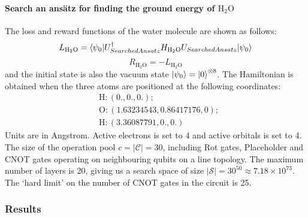 \documentclass{ieeeaccess}
\begin{document}
\paragraph{Search an ans\"atz for finding the ground energy of $\text{H}_2\text{O}$} The loss and reward functions of the water molecule are shown as follows:
\begin{equation}
    L_{\text{H}_2\text{O}} =\langle \psi_0 \vert U_{\rm SearchedAnsatz}^{\dagger} H_{\text{H}_2\text{O}} U_{\rm SearchedAnsatz} \vert \psi_0\rangle
\end{equation}
\begin{equation}
    R_{\text{H}_2\text{O}} = -L_{\text{H}_2\text{O}}
\end{equation}
and the initial state is also the vacuum state $\ket{\psi_0} = \ket{0}^{\otimes 8}$. The Hamiltonian is obtained when the three atoms are positioned at the following coordinates:
\begin{equation}
    \begin{split}
    &\text{H}:(0.,0.,0.); \\
    &\text{O}:(1.63234543, 0.86417176, 0);\\
    &\text{H}:(3.36087791, 0.,0.)
    \end{split}
\end{equation}
Units are in Angstrom.
Active electrons is set to 4 and active orbitals is set to 4. The size of the operation pool $c = \vert \mathcal{C} \vert = 30$, including Rot gates, Placeholder and CNOT gates operating on neighbouring qubits on a line topology. The maximum number of layers is 20, giving us a search space of size $\vert \mathcal{S} \vert = 30^{50} \approx 7.18\times 10^{73}$. The `hard limit' on the number of CNOT gates in the circuit is 25.
\subsubsection{Results}
\end{document}
